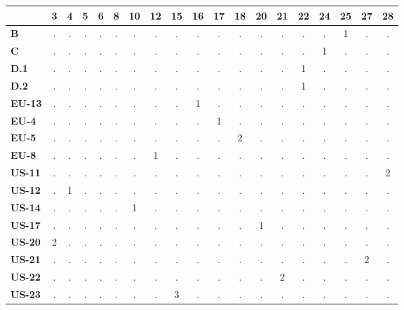 \documentclass[double,12pt]{beavtex}
\begin{document}
  \begin{table}
  \centering
  \begin{tabular}{l|cccccccccccccccccc}
    & \textbf{3} & \textbf{4} & \textbf{5} & \textbf{6} & \textbf{8} & \textbf{10} & \textbf{12} & \textbf{15} & \textbf{16} & \textbf{17} & \textbf{18} & \textbf{20} & \textbf{21} & \textbf{22} & \textbf{24} & \textbf{25} & \textbf{27} & \textbf{28} \\ 
    \midrule
  \textbf{B} & . & . & . & . & . & . & . & . & . & . & . & . & . & . & . & 1 & . & . \\ 
    \textbf{C} & . & . & . & . & . & . & . & . & . & . & . & . & . & . & 1 & . & . & . \\ 
    \textbf{D.1} & . & . & . & . & . & . & . & . & . & . & . & . & . & 1 & . & . & . & . \\ 
    \textbf{D.2} & . & . & . & . & . & . & . & . & . & . & . & . & . & 1 & . & . & . & . \\ 
    \textbf{EU-13} & . & . & . & . & . & . & . & . & 1 & . & . & . & . & . & . & . & . & . \\ 
    \textbf{EU-4} & . & . & . & . & . & . & . & . & . & 1 & . & . & . & . & . & . & . & . \\ 
    \textbf{EU-5} & . & . & . & . & . & . & . & . & . & . & 2 & . & . & . & . & . & . & . \\ 
    \textbf{EU-8} & . & . & . & . & . & . & 1 & . & . & . & . & . & . & . & . & . & . & . \\ 
    \textbf{US-11} & . & . & . & . & . & . & . & . & . & . & . & . & . & . & . & . & . & 2 \\ 
    \textbf{US-12} & . & 1 & . & . & . & . & . & . & . & . & . & . & . & . & . & . & . & . \\ 
    \textbf{US-14} & . & . & . & . & . & 1 & . & . & . & . & . & . & . & . & . & . & . & . \\ 
    \textbf{US-17} & . & . & . & . & . & . & . & . & . & . & . & 1 & . & . & . & . & . & . \\ 
    \textbf{US-20} & 2 & . & . & . & . & . & . & . & . & . & . & . & . & . & . & . & . & . \\ 
    \textbf{US-21} & . & . & . & . & . & . & . & . & . & . & . & . & . & . & . & . & 2 & . \\ 
    \textbf{US-22} & . & . & . & . & . & . & . & . & . & . & . & . & 2 & . & . & . & . & . \\ 
    \textbf{US-23} & . & . & . & . & . & . & . & 3 & . & . & . & . & . & . & . & . & . & . \\ 

\end{tabular}
\end{table}
\end{document}
